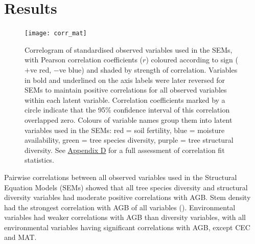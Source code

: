 \documentclass[11pt,a4paper]{article}
\begin{document}

\section{Results}

\begin{figure}[H]
\centering
	\texttt{[image: corr\_mat]}
	\caption{Correlogram of standardised observed variables used in the SEMs, with Pearson correlation coefficients ($r$) coloured according to sign ($+$ve red, $-$ve blue) and shaded by strength of correlation. Variables in bold and underlined on the axis labels were later reversed for SEMs to maintain positive correlations for all observed variables within each latent variable. Correlation coefficients marked by a circle indicate that the 95\% confidence interval of this correlation overlapped zero. Colours of variable names group them into latent variables used in the SEMs: red = soil fertility, blue = moisture availability, green = tree species diversity, purple = tree structural diversity. See \hyperref[appendixd]{Appendix D} for a full assessment of correlation fit statistics.}
	\label{corr_mat}
\end{figure}

Pairwise correlations between all observed variables used in the Structural Equation Models (SEMs) showed that all tree species diversity and structural diversity variables had moderate positive correlations with AGB. Stem density had the strongest correlation with AGB of all variables (\ccib{}). Environmental variables had weaker correlations with AGB than diversity variables, with all environmental variables having significant correlations with AGB, except CEC and MAT.
\end{document}
